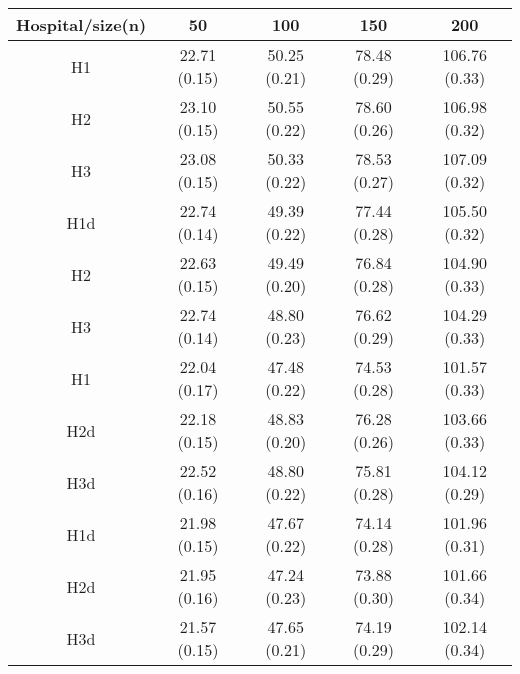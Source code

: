 \begin{center}
\begin{tabular}{c | c | c | c | c}
Hospital/size(n) & 50 & 100 & 150 & 200\\ \hline
H1 & 22.71 (0.15) & 50.25 (0.21) & 78.48 (0.29) & 106.76 (0.33) \\
H2 & 23.10 (0.15) & 50.55 (0.22) & 78.60 (0.26) & 106.98 (0.32) \\
H3 & 23.08 (0.15) & 50.33 (0.22) & 78.53 (0.27) & 107.09 (0.32) \\
H1d & 22.74 (0.14) & 49.39 (0.22) & 77.44 (0.28) & 105.50 (0.32) \\
H2 & 22.63 (0.15) & 49.49 (0.20) & 76.84 (0.28) & 104.90 (0.33) \\
H3 & 22.74 (0.14) & 48.80 (0.23) & 76.62 (0.29) & 104.29 (0.33) \\
H1 & 22.04 (0.17) & 47.48 (0.22) & 74.53 (0.28) & 101.57 (0.33) \\
H2d & 22.18 (0.15) & 48.83 (0.20) & 76.28 (0.26) & 103.66 (0.33) \\
H3d & 22.52 (0.16) & 48.80 (0.22) & 75.81 (0.28) & 104.12 (0.29) \\
H1d & 21.98 (0.15) & 47.67 (0.22) & 74.14 (0.28) & 101.96 (0.31) \\
H2d & 21.95 (0.16) & 47.24 (0.23) & 73.88 (0.30) & 101.66 (0.34) \\
H3d & 21.57 (0.15) & 47.65 (0.21) & 74.19 (0.29) & 102.14 (0.34) \\
\end{tabular}
\end{center}
